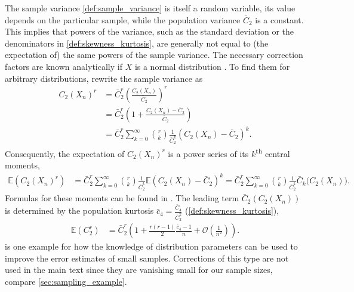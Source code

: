 \documentclass[12pt,a4paper]{article}
\renewcommand{\|}{\rule[-0.4ex]{0.2ex}{1.2em}}
\begin{document}
The sample variance \cref{def:sample_variance} is itself a random variable, its value depends on the particular sample, while the population variance $\bar C_2$ is a constant. This implies that powers of the variance, such as the standard deviation or the denominators in \cref{def:skewness_kurtosis}, are generally not equal to (the expectation of) the same powers of the sample variance. The necessary correction factors are known analytically if $X$ is a normal distribution \cite{holtzman_unbiased_1950}. To find them for arbitrary distributions, rewrite the sample variance as
\begin{align*}
	C_2(X_n)^r &= \bar C_2 ^r \left( \frac{  C_2(X_n)}{\bar C_2 } \right) ^r \\ &=  \bar C_2 ^r  \left(  1 + \frac{  C_2(X_n) -\bar C_2 }{\bar C_2 } \right)\\ & =\bar C_2^r \sum_{k=0}^\infty  \binom r k \frac{1}{\bar C_2^k} \left( C_2(X_n)-\bar C_2 \right) ^k.
\end{align*}
Consequently, the expectation of $C_2(X_n)^r$ is a power series  of its $k$\textsuperscript{th} central moments,
\begin{align*}
	\mathbb E \left( C_2(X_n)^r \right)   &=  \bar C_2^r \sum_{k=0}^\infty  \binom r k \frac{1}{\bar C_2^k} \mathbb E \left( C_2(X_n)-\bar C_2 \right) ^k= \bar C_2^r \sum_{k=0}^\infty  \binom r k \frac{1}{\bar C_2^k} \bar C_k \Big(   C_2(X_n)\Big). 
\end{align*}
Formulas for these moments can be found in \cite{angelova_moments_2012}. The leading term    $\bar C_2\left( C_2(X_n) \right) $ is determined by the population kurtosis $\bar c_4= \frac{\bar C_4}{\bar C_2^2}$ (\cref{def:skewness_kurtosis}),
\begin{align}\label{kurtosis_correction}
	\mathbb E \left( C_2^r \right) &=  \bar C_2^r \left( 1 +   \frac{r(r-1)}{2}  \frac{\bar c_4 -1}{n}  +\mathcal O \left( \frac{1}{n^2} \right)     \right) . 
\end{align} 
 is one example for how the knowledge of distribution parameters can be used to improve the error estimates of small samples. Corrections of this type are not used in the main text since they are vanishing small for our sample sizes, compare \cref{sec:sampling_example}.
\end{document}
